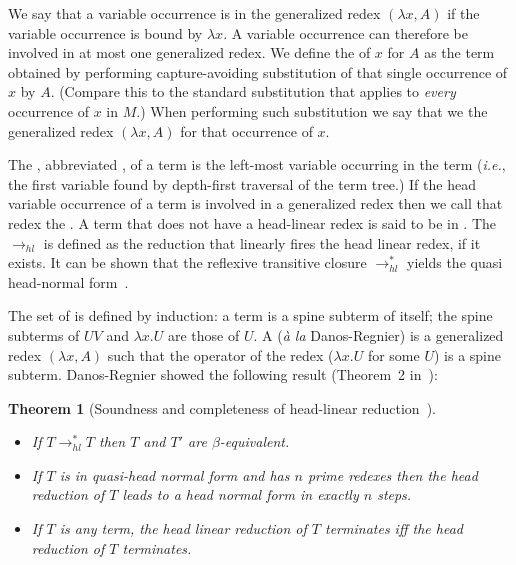 \documentclass{elsarticle}
\makeatletter
\theoremstyle{plain}
\newtheorem{theorem}{Theorem}[section]
\theoremstyle{definition}
\renewcommand\ie{{\it i.e.\@\xspace}}
\newcommand{\hlred}{\rightarrow_{hl}}
\makeatother
\begin{document}
We say that a variable occurrence is  in the generalized redex $(\lambda x, A)$ if the variable occurrence is bound by $\lambda x$. A variable occurrence can therefore be involved in at most one generalized redex. We define the  of $x$ for $A$ as the term obtained by performing capture-avoiding substitution of that single occurrence of $x$ by $A$. (Compare this to the standard substitution that applies to \emph{every} occurrence of $x$ in $M$.) When performing such substitution we say that we  the generalized redex $(\lambda x, A)$ for that occurrence of $x$.

The , abbreviated , of a term is the left-most variable occurring in the term (\ie, the first variable found by depth-first traversal of the term tree.) If the head variable occurrence of a term is involved in a generalized redex then we call that redex the .
A term that does not have a head-linear redex is said to be in .
The  $\hlred$ is defined as the reduction that linearly fires the head linear redex, if it exists. It can be shown that the reflexive transitive closure $\rightarrow^*_{hl}$ yields the quasi head-normal form~\cite{danos-head,danosherbelinregnier1996}.

The set of  is defined by induction: a term is a spine subterm of itself; the spine subterms of $U V$ and $\lambda x. U$ are those of $U$.
A  ({\it \`a la} Danos-Regnier) is a generalized redex $(\lambda x, A)$ such that the operator of the redex ($\lambda x . U$ for some $U$) is a spine subterm. Danos-Regnier showed the following result (Theorem~2 in~\cite{danos-head}):
\begin{theorem}[Soundness and completeness of head-linear reduction~\cite{danos-head}] \
\label{thm:danosregnier_headlinred}
\begin{itemize}[nosep]
\item If $T \rightarrow^*_{hl} T$  then $T$ and $T'$ are $\beta$-equivalent.
\item If $T$ is in quasi-head normal form and has $n$ prime redexes then the head reduction of $T$ leads to a head normal form in exactly $n$ steps.
\item If $T$ is any term, the head linear reduction of $T$ terminates iff the head reduction of $T$ terminates.
\end{itemize}
\end{theorem}
\end{document}

